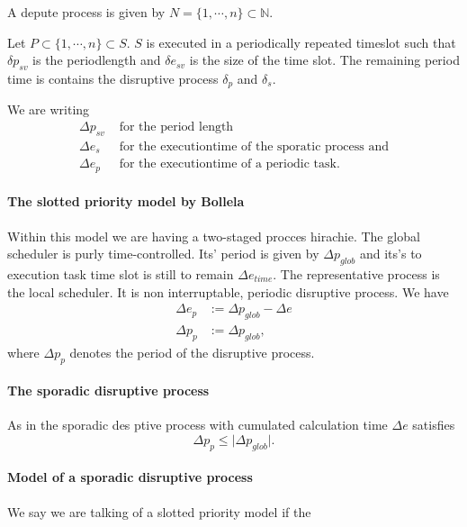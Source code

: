 A depute process is given by $ N = \{1, \cdots, n\}\subset \mathbb{N}$. 

Let $P \subset \{1, \cdots, n\} \subset S$.
$S$ is executed in a periodically repeated timeslot such that $\delta p_{sv}$ is the periodlength and $\delta e_{sv}$ is the size of the time slot.
The remaining period time is contains the  disruptive process $\delta_p$ and $\delta_s$.

We are writing
\begin{align}
	\Delta p_{sv} &\text{ for the period length} \\
	\Delta e_s &\text{ for the executiontime of the sporatic process and}\\ 
	\Delta e_p &\text{ for the executiontime of a periodic task.}
\end{align}

\paragraph{The slotted priority model by Bollela}

Within this model we are having a two-staged procces hirachie. 
The global scheduler is purly time-controlled.
Its' period is given by $\Delta p_{glob}$ and its's to execution task time slot is still to remain $\Delta e_{time}$.
The representative process is the local scheduler. 
It is non interruptable, periodic disruptive process.
We have
\begin{align}
\Delta e_p &:= \Delta p_{glob} - \Delta e\\
\Delta p_{p} &:= \Delta p_{glob}, 
\end{align}
where $\Delta p_{p}$ denotes the period of the disruptive process.

\paragraph{The sporadic disruptive process}
As in \cite{K} the sporadic des
ptive process with cumulated calculation time $\Delta e$ satisfies
\begin{equation}
\Delta p_{p} \leq \lvert{\Delta p_{glob}} \rvert. 
\end{equation}


\paragraph{Model of a sporadic disruptive process}
We say we are talking of a slotted priority model if the 

